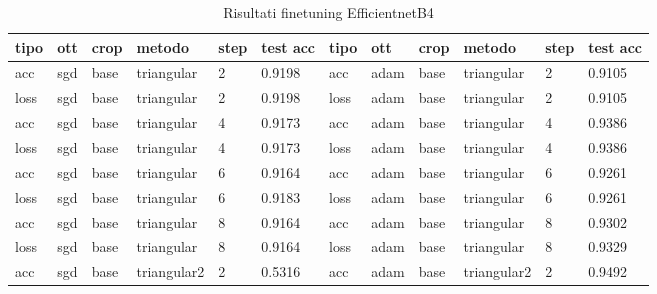 \begin{table}[H]
\centering
\caption{Risultati finetuning EfficientnetB4}
\begin{adjustbox}{width=1\textwidth}
\begin{tabular}{|l|l|l|l|l|l||l|l|l|l|l|l|}
\hline
\textbf{tipo} & \textbf{ott} & \textbf{crop} & \textbf{metodo} & \textbf{step} & \textbf{test acc} & \textbf{tipo} & \textbf{ott} & \textbf{crop} & \textbf{metodo} & \textbf{step} & \textbf{test acc} \\ \hline
acc           & sgd          & base          & triangular      & 2             & 0.9198            & acc           & adam         & base          & triangular      & 2             & 0.9105            \\ \hline
loss          & sgd          & base          & triangular      & 2             & 0.9198            & loss          & adam         & base          & triangular      & 2             & 0.9105            \\ \hline
acc           & sgd          & base          & triangular      & 4             & 0.9173            & acc           & adam         & base          & triangular      & 4             & 0.9386            \\ \hline
loss          & sgd          & base          & triangular      & 4             & 0.9173            & loss          & adam         & base          & triangular      & 4             & 0.9386            \\ \hline
acc           & sgd          & base          & triangular      & 6             & 0.9164            & acc           & adam         & base          & triangular      & 6             & 0.9261            \\ \hline
loss          & sgd          & base          & triangular      & 6             & 0.9183            & loss          & adam         & base          & triangular      & 6             & 0.9261            \\ \hline
acc           & sgd          & base          & triangular      & 8             & 0.9164            & acc           & adam         & base          & triangular      & 8             & 0.9302            \\ \hline
loss          & sgd          & base          & triangular      & 8             & 0.9164            & loss          & adam         & base          & triangular      & 8             & 0.9329            \\ \hline
acc           & sgd          & base          & triangular2     & 2             & 0.5316            & acc           & adam         & base          & triangular2     & 2             & 0.9492            \\ \hline

\end{tabular}
\end{adjustbox}
\end{table}
